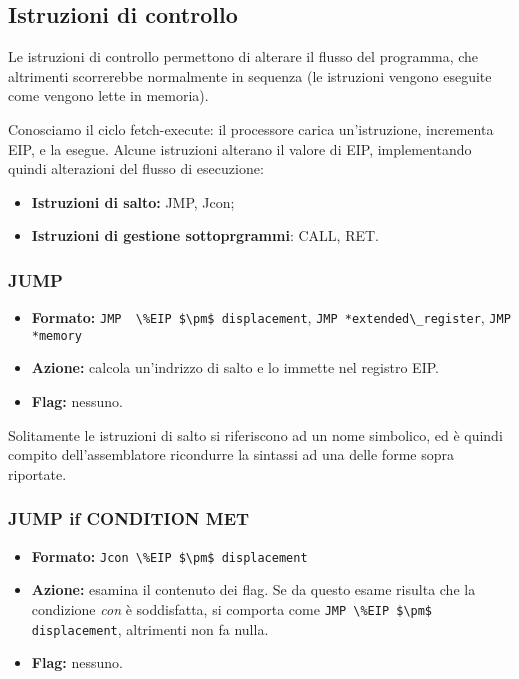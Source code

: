 \documentclass[a4paper,11pt]{article}
\begin{document}
\subsection{Istruzioni di controllo}
Le istruzioni di controllo permettono di alterare il flusso del programma, che altrimenti scorrerebbe normalmente in sequenza (le istruzioni vengono eseguite come vengono lette in memoria).

Conosciamo il ciclo fetch-execute: il processore carica un'istruzione, incrementa EIP, e la esegue.
Alcune istruzioni alterano il valore di EIP, implementando quindi alterazioni del flusso di esecuzione:
\begin{itemize}
	\item \textbf{Istruzioni di salto:} JMP, Jcon;
	\item \textbf{Istruzioni di gestione sottoprgrammi}: CALL, RET.
\end{itemize}

\subsubsection{JUMP}
\begin{itemize}
	\item \textbf{Formato:} \lstinline|JMP  \%EIP $\pm$ displacement|, \lstinline|JMP *extended\_register|, \lstinline|JMP *memory|
	\item \textbf{Azione:} calcola un'indrizzo di salto e lo immette nel registro EIP. 
	\item \textbf{Flag:} nessuno. 
\end{itemize}

Solitamente le istruzioni di salto si riferiscono ad un nome simbolico, ed è quindi compito dell'assemblatore ricondurre la sintassi ad una delle forme sopra riportate.

\subsubsection{JUMP if CONDITION MET}
\begin{itemize}
	\item \textbf{Formato:} \lstinline|Jcon \%EIP $\pm$ displacement|
	\item \textbf{Azione:} esamina il contenuto dei flag.
		Se da questo esame risulta che la condizione \textit{con} è soddisfatta, si comporta come \lstinline|JMP \%EIP $\pm$ displacement|, altrimenti non fa nulla.
	\item \textbf{Flag:} nessuno. 
\end{itemize}
\end{document}
